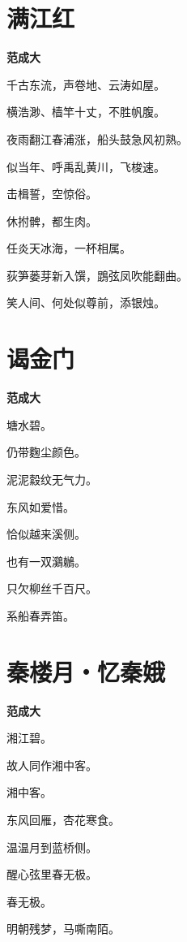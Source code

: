 \documentclass[12pt,a4paper]{ctexbook}
\begin{document}
\section{满江红}
\textbf{范成大}\par\vspace{0.5em}
千古东流，声卷地、云涛如屋。\par
横浩渺、樯竿十丈，不胜帆腹。\par
夜雨翻江春浦涨，船头鼓急风初熟。\par
似当年、呼禹乱黄川，飞梭速。\par
击楫誓，空惊俗。\par
休拊髀，都生肉。\par
任炎天冰海，一杯相属。\par
荻笋蒌芽新入馔，鵾弦凤吹能翻曲。\par
笑人间、何处似尊前，添银烛。\par

\section{谒金门}
\textbf{范成大}\par\vspace{0.5em}
塘水碧。\par
仍带麴尘颜色。\par
泥泥縠纹无气力。\par
东风如爱惜。\par
恰似越来溪侧。\par
也有一双鸂鶒。\par
只欠柳丝千百尺。\par
系船春弄笛。\par

\section{秦楼月・忆秦娥}
\textbf{范成大}\par\vspace{0.5em}
湘江碧。\par
故人同作湘中客。\par
湘中客。\par
东风回雁，杏花寒食。\par
温温月到蓝桥侧。\par
醒心弦里春无极。\par
春无极。\par
明朝残梦，马嘶南陌。\par
\end{document}

